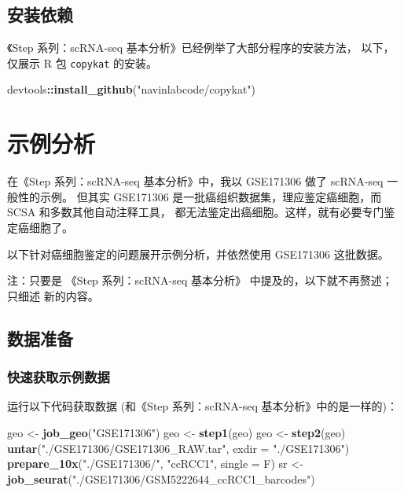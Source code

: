 \documentclass[
]{article}
\newenvironment{Shaded}{\begin{snugshade}}{\end{snugshade}}
\newcommand{\DataTypeTok}[1]{\textcolor[rgb]{0.13,0.29,0.53}{#1}}
\newcommand{\KeywordTok}[1]{\textcolor[rgb]{0.13,0.29,0.53}{\textbf{#1}}}
\newcommand{\NormalTok}[1]{#1}
\newcommand{\OperatorTok}[1]{\textcolor[rgb]{0.81,0.36,0.00}{\textbf{#1}}}
\newcommand{\StringTok}[1]{\textcolor[rgb]{0.31,0.60,0.02}{#1}}
\begin{document}
\hypertarget{ux5b89ux88c5ux4f9dux8d56}{%
\subsection{安装依赖}\label{ux5b89ux88c5ux4f9dux8d56}}

《Step 系列：scRNA-seq 基本分析》已经例举了大部分程序的安装方法，
以下，仅展示 R 包 \texttt{copykat} 的安装。

\begin{Shaded}
\begin{Highlighting}[]
\NormalTok{devtools}\OperatorTok{::}\KeywordTok{install\_github}\NormalTok{(}\StringTok{"navinlabcode/copykat"}\NormalTok{)}
\end{Highlighting}
\end{Shaded}

\hypertarget{ux793aux4f8bux5206ux6790}{%
\section{示例分析}\label{ux793aux4f8bux5206ux6790}}

在《Step 系列：scRNA-seq 基本分析》中，我以 GSE171306 做了 scRNA-seq 一般性的示例。
但其实 GSE171306 是一批癌组织数据集，理应鉴定癌细胞，而 SCSA 和多数其他自动注释工具，
都无法鉴定出癌细胞。这样，就有必要专门鉴定癌细胞了。

以下针对癌细胞鉴定的问题展开示例分析，并依然使用 GSE171306 这批数据。

注：只要是 《Step 系列：scRNA-seq 基本分析》 中提及的，以下就不再赘述；只细述
新的内容。

\hypertarget{ux6570ux636eux51c6ux5907}{%
\subsection{数据准备}\label{ux6570ux636eux51c6ux5907}}

\hypertarget{obtain}{%
\subsubsection{快速获取示例数据}\label{obtain}}

运行以下代码获取数据 (和《Step 系列：scRNA-seq 基本分析》中的是一样的)：

\begin{Shaded}
\begin{Highlighting}[]
\NormalTok{geo \textless{}{-}}\StringTok{ }\KeywordTok{job\_geo}\NormalTok{(}\StringTok{"GSE171306"}\NormalTok{)}
\NormalTok{geo \textless{}{-}}\StringTok{ }\KeywordTok{step1}\NormalTok{(geo)}
\NormalTok{geo \textless{}{-}}\StringTok{ }\KeywordTok{step2}\NormalTok{(geo)}
\KeywordTok{untar}\NormalTok{(}\StringTok{"./GSE171306/GSE171306\_RAW.tar"}\NormalTok{, }\DataTypeTok{exdir =} \StringTok{"./GSE171306"}\NormalTok{)}
\KeywordTok{prepare\_10x}\NormalTok{(}\StringTok{"./GSE171306/"}\NormalTok{, }\StringTok{"ccRCC1"}\NormalTok{, }\DataTypeTok{single =}\NormalTok{ F)}
\NormalTok{sr \textless{}{-}}\StringTok{ }\KeywordTok{job\_seurat}\NormalTok{(}\StringTok{"./GSE171306/GSM5222644\_ccRCC1\_barcodes"}\NormalTok{)}
\end{Highlighting}
\end{Shaded}
\end{document}
